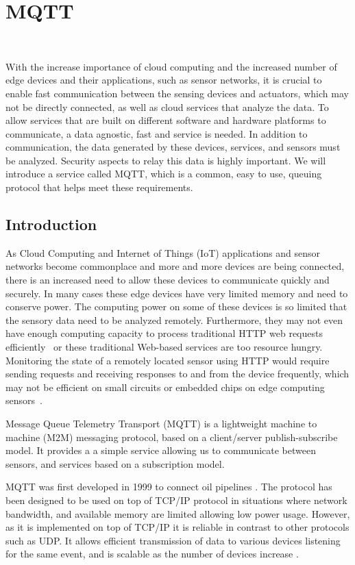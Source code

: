 \chapter{MQTT}
\label{c:mqtt}

\FILENAME\

With the increase importance of cloud computing and the increased
number of edge devices and their applications, such as sensor
networks, it is crucial to enable fast communication between the
sensing devices and actuators, which may not be directly connected, as
well as cloud services that analyze the data. To allow services that
are built on different software and hardware platforms to communicate,
a data agnostic, fast and service is needed. In addition to
communication, the data generated by these devices, services, and
sensors must be analyzed. Security aspects to relay this data is
highly important. We will introduce a service called MQTT, which is a
common, easy to use, queuing protocol that helps meet these
requirements.  


\section{Introduction}

As Cloud Computing and Internet of Things (IoT) applications and
sensor networks become commonplace and more and more devices are being
connected, there is an increased need to allow these devices to
communicate quickly and securely. In many cases these edge devices
have very limited memory and need to conserve power. The computing
power on some of these devices is so limited that the sensory data
need to be analyzed remotely. Furthermore, they may not even have
enough computing capacity to process traditional HTTP web requests
efficiently~\cite{mqtt-vs-http}\cite{hivemq-website} or these traditional
Web-based services are too resource hungry. Monitoring the state of a
remotely located sensor using HTTP would require sending requests and
receiving responses to and from the device frequently, which may not
be efficient on small circuits or embedded chips on edge computing
sensors~\cite{mqtt-vs-http}.

Message Queue Telemetry Transport (MQTT) is a lightweight machine to
machine (M2M) messaging protocol, based on a client/server 
publish-subscribe model. It provides a a simple service allowing us to
communicate between sensors, and services based on a subscription
model.

MQTT was first developed in 1999 to connect oil pipelines
\cite{hivemq-website}. The protocol has been designed to be used on
top of TCP/IP protocol in situations where network bandwidth, and
available memory are limited allowing low power usage. However, as it
is implemented on top of TCP/IP it is reliable in contrast to other
protocols such as UDP. It allows efficient transmission of
data to various devices listening for the same event, and is scalable
as the number of devices increase
\cite{mqtt-wiki}\cite{mqtt-official}.

